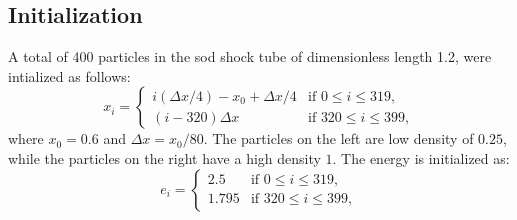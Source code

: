 \documentclass[11pt]{article}
\begin{document}
\subsection{Initialization}
A total of 400 particles in the sod shock tube of dimensionless length 1.2, were intialized as follows:
\begin{equation}
x_i = \begin{cases}
i(\Delta x/4) - x_0 + \Delta x/4 & \text{if } 0 \leq i \leq 319, \\
(i - 320)\Delta x & \text{if } 320 \leq i \leq 399,
\end{cases}
\end{equation}
where $x_0 = 0.6$ and $\Delta x = x_0 / 80$. The particles on the left are low density  of $0.25$, while the particles on the right have a high density $1$.
The energy is initialized as:
\begin{equation}
e_i = \begin{cases}
2.5 & \text{if } 0 \leq i \leq 319, \\
1.795 & \text{if } 320 \leq i \leq 399,
\end{cases}
\end{equation}
\end{document}
